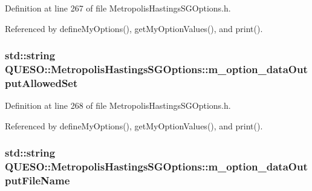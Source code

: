 Definition at line 267 of file Metropolis\-Hastings\-S\-G\-Options.\-h.



Referenced by define\-My\-Options(), get\-My\-Option\-Values(), and print().

\hypertarget{class_q_u_e_s_o_1_1_metropolis_hastings_s_g_options_a7d12ea603c8aba9215ad462d51720204}{
\subsubsection[{m\-\_\-option\-\_\-data\-Output\-Allowed\-Set}]{\setlength{\rightskip}{0pt plus 5cm}std\-::string Q\-U\-E\-S\-O\-::\-Metropolis\-Hastings\-S\-G\-Options\-::m\-\_\-option\-\_\-data\-Output\-Allowed\-Set\hspace{0.3cm}{\ttfamily [private]}}}\label{class_q_u_e_s_o_1_1_metropolis_hastings_s_g_options_a7d12ea603c8aba9215ad462d51720204}


Definition at line 268 of file Metropolis\-Hastings\-S\-G\-Options.\-h.



Referenced by define\-My\-Options(), get\-My\-Option\-Values(), and print().

\hypertarget{class_q_u_e_s_o_1_1_metropolis_hastings_s_g_options_ae5efdb40f8282073ebcad5892af4be44}{
\subsubsection[{m\-\_\-option\-\_\-data\-Output\-File\-Name}]{\setlength{\rightskip}{0pt plus 5cm}std\-::string Q\-U\-E\-S\-O\-::\-Metropolis\-Hastings\-S\-G\-Options\-::m\-\_\-option\-\_\-data\-Output\-File\-Name\hspace{0.3cm}{\ttfamily [private]}}}\label{class_q_u_e_s_o_1_1_metropolis_hastings_s_g_options_ae5efdb40f8282073ebcad5892af4be44}


